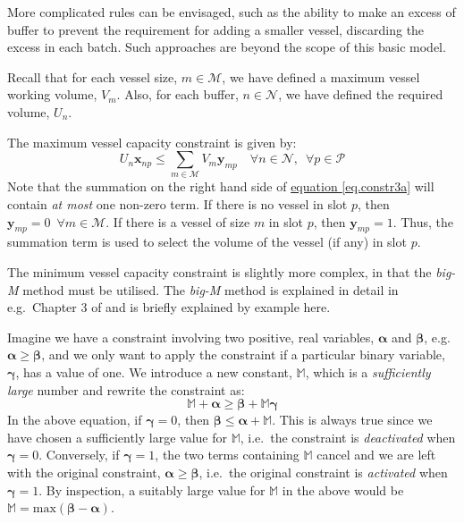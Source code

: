 More complicated rules can be envisaged, such as the ability to make an excess
of buffer to prevent the requirement for adding a smaller vessel, discarding
the excess in each batch.  Such approaches are beyond the scope of this basic
model.

Recall that for each vessel size, $m \in \mathcal{M}$, we have defined a
maximum vessel working volume, $V_{m}$.
Also, for each buffer, $n \in \mathcal{N}$, we have defined the required
volume, $U_{n}$.

The maximum vessel capacity constraint is given by:
\begin{equation}
    U_{n} \boldsymbol{x}_{np} \le \sum_{m \in \mathcal{M}} V_{m} 
    \boldsymbol{y}_{mp} \quad \forall n \in \mathcal{N}, \enspace \forall p 
    \in \mathcal{P}
    \label{eq.constr3a}
\end{equation}
Note that the summation on the right hand side of
\hyperref[eq.constr3a]{equation \ref*{eq.constr3a}} will contain \emph{at most}
one non-zero term. If there is no vessel in slot $p$, then 
$\boldsymbol{y}_{mp} = 0 \enspace \forall m \in \mathcal{M}$.
If there is a vessel of size $m$ in slot $p$, then $\boldsymbol{y}_{mp} = 1$.
Thus, the summation term is used to select the volume of the vessel (if any)
in slot $p$.

The minimum vessel capacity constraint is slightly more complex, in that the
\emph{big-M} method must be utilised.
The \emph{big-M} method is explained in detail in e.g.\ Chapter 3 of 
\citet{Taha:2017} and is briefly explained by example here.

Imagine we have a constraint involving two positive, real variables, 
$\boldsymbol{\alpha}$ and $\boldsymbol{\beta}$, e.g.\ 
$\boldsymbol{\alpha} \ge \boldsymbol{\beta}$, and
we only want to apply the constraint if a particular
binary variable, $\boldsymbol{\gamma}$, has a value of one.
We introduce a new constant, $\mathbb{M}$, which is a \emph{sufficiently large}
number and rewrite the constraint as:
\begin{equation}
    \mathbb{M} + \boldsymbol{\alpha} \ge \boldsymbol{\beta}+ \mathbb{M}
    \boldsymbol{\gamma}
\end{equation}
In the above equation, if $\boldsymbol{\gamma} = 0$, then 
$\boldsymbol{\beta} \le \boldsymbol{\alpha} + \mathbb{M}$.
This is always true since we have chosen a sufficiently large value for
$\mathbb{M}$, i.e.\ the constraint is \emph{deactivated} when
$\boldsymbol{\gamma} = 0$.
Conversely, if $\boldsymbol{\gamma} = 1$, the two terms containing $\mathbb{M}$
cancel and we are left with the original constraint,
$\boldsymbol{\alpha} \ge \boldsymbol{\beta}$, i.e.\ the original constraint is
\emph{activated} when $\boldsymbol{\gamma} = 1$.
By inspection, a suitably large value for $\mathbb{M}$ in the above would be
$\mathbb{M} = \text{max} \left( \boldsymbol{\beta} - \boldsymbol{\alpha} 
 \right)$.

